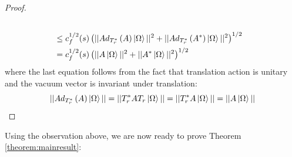 \documentclass[a4paper,11pt]{article}
\theoremstyle{definition}
\newcommand{\lb}{\left(}
\newcommand{\rb}{\right)}
\begin{document}
\begin{proof}
\begin{align}
\begin{split}
            \\&\leq c^{1/2}_f(s)\lb||Ad_{T_r^*}\lb A \rb\ket{\Omega}||^2 + ||Ad_{T^*_r}\lb A^*\rb\ket{\Omega}||^2\rb^{1/2}
            \\&
            =c_f^{1/2}(s)\lb ||A\ket{\Omega}||^2 + ||A^*\ket{\Omega}||^2 \rb^{1/2}
        \end{split}
    \end{align}
    where the last equation follows from the fact that translation action is unitary and the vacuum vector is invariant under translation:
    \begin{equation}
        ||Ad_{T_r^*}\lb A \rb\ket{\Omega}|| = ||T^*_rAT_r\ket{\Omega}|| = ||T_r^*A\ket{\Omega}|| = ||A\ket{\Omega}||\qedhere
    \end{equation}
\end{proof}
Using the observation above, we are now ready to prove Theorem \ref{theorem:mainresult}:
\end{document}
